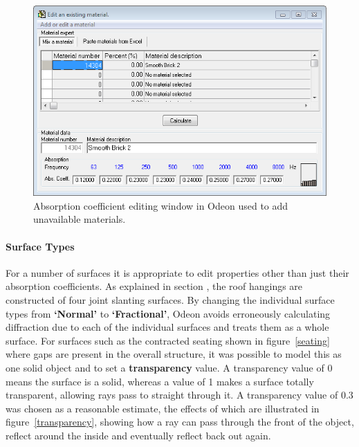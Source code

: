 \documentclass[../../main.tex]{subfiles}
\begin{document}
			\begin{figure}[H]
				\centerline{\includegraphics[width=\textwidth]{Sections/Implementation/Odeon/images/Absorption.PNG}}
				\caption{Absorption coefficient editing window in Odeon used to add unavailable materials.}
				\label{materialEdit}
			\end{figure}

		\paragraph{Surface Types}
			\label{surfaceTypes}

			For a number of surfaces it is appropriate to edit properties other than just their absorption coefficients. As explained in section , the roof hangings are constructed of four joint slanting surfaces. By changing the individual surface types from \textbf{`Normal'} to \textbf{`Fractional'}, Odeon avoids erroneously calculating diffraction due to each of the individual surfaces and treats them as a whole surface. For surfaces such as the contracted seating shown in figure~\ref{seating} where gaps are present in the overall structure, it was possible to model this as one solid object and to set a \textbf{transparency} value. A transparency value of 0 means the surface is a solid, whereas a value of 1 makes a surface totally transparent, allowing rays pass to straight through it. A transparency value of 0.3 was chosen as a reasonable estimate, the effects of which are illustrated in figure~\ref{transparency}, showing how a ray can pass through the front of the object, reflect around the inside and eventually reflect back out again.
\end{document}
